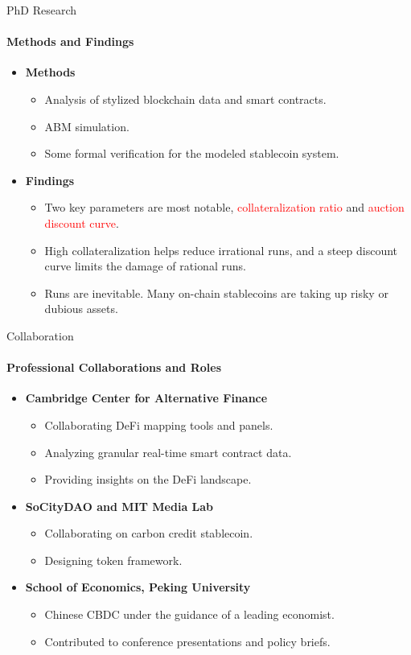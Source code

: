 \documentclass{beamer}
\begin{document}
\begin{frame}{PhD Research}
\framesubtitle{Methods and Findings}

\begin{itemize}
\item \textbf{Methods}
\begin{itemize}
\item Analysis of stylized blockchain data and smart contracts.
\item ABM simulation. 
\item Some formal verification for the modeled stablecoin system.
\end{itemize}

\item \textbf{Findings}
\begin{itemize}
\item Two key parameters are most notable, \textcolor{red}{collateralization ratio} and \textcolor{red}{auction discount curve}.
\item High collateralization helps reduce irrational runs, and a steep discount curve limits the damage of rational runs. 
\item Runs are inevitable. Many on-chain stablecoins are taking up risky or dubious assets.  
\end{itemize}
\end{itemize}
\end{frame}


\begin{frame}{Collaboration}
\framesubtitle{Professional Collaborations and Roles}
\begin{itemize}
\item \textbf{Cambridge Center for Alternative Finance}
\begin{itemize}
    \item Collaborating DeFi mapping tools and panels.
    \item Analyzing granular real-time smart contract data.
    \item Providing insights on the DeFi landscape. 
\end{itemize}
\item \textbf{SoCityDAO and MIT Media Lab}
\begin{itemize}
\item Collaborating on carbon credit stablecoin.
\item Designing token framework.
\end{itemize}
\item \textbf{School of Economics, Peking University}
\begin{itemize}
\item Chinese CBDC under the guidance of a leading economist.
\item Contributed to conference presentations and policy briefs.
\end{itemize}
\end{itemize}
\end{frame}
\end{document}
